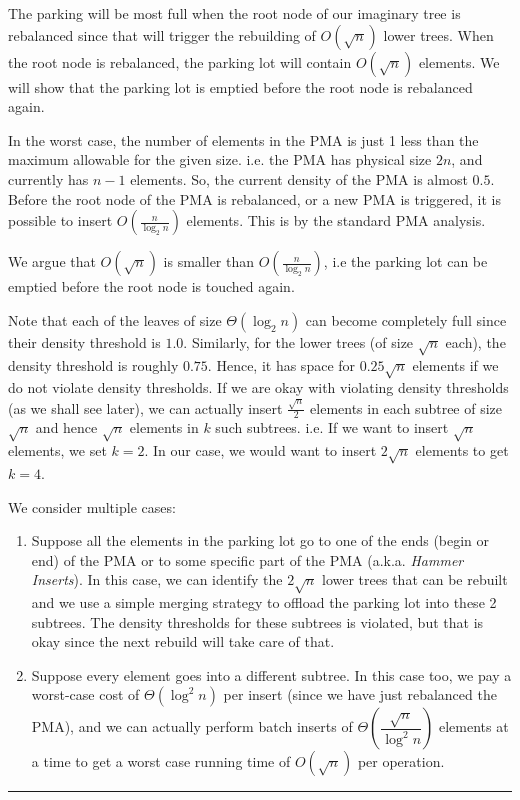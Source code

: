 \documentclass[10pt]{article}
\newenvironment{proof}{{\bf Proof:  }}{\hfill\rule{2mm}{2mm}}
\begin{document}
\begin{proof}

The parking will be most full when the root node of our imaginary tree
is rebalanced since that will trigger the rebuilding of $O(\sqrt{n})$
lower trees. When the root node is rebalanced, the parking lot will
contain $O(\sqrt{n})$ elements. We will show that the parking lot is
emptied before the root node is rebalanced again.

In the worst case, the number of elements in the PMA is just 1 less
than the maximum allowable for the given size. i.e. the PMA has
physical size $2n$, and currently has $n-1$ elements. So, the current density of the PMA is almost
$0.5$. Before the root node of the PMA is rebalanced, or a new PMA is triggered, it is possible to insert $O(\frac{n}{\log_2{n}})$ elements. This is by the standard PMA analysis.

We argue that $O(\sqrt{n})$ is smaller than  $O(\frac{n}{\log_2{n}})$, i.e the parking lot can be emptied before the root node is touched again.

Note that each of the leaves of size $\Theta(\log_2{n})$ can become completely full
since their density threshold is $1.0$.  Similarly, for the lower trees (of size $\sqrt{n}$ each), the
density threshold is roughly $0.75$. Hence, it has space for $0.25\sqrt{n}$
elements if we do not violate density thresholds. If we are okay with
violating density thresholds (as we shall see later), we can actually
insert $\frac{\sqrt{n}}{2}$ elements in each subtree of size
$\sqrt{n}$ and hence $\sqrt{n}$ elements in $k$ such subtrees. i.e. If
we want to insert $\sqrt{n}$ elements, we set $k = 2$. In our case, we
would want to insert $2\sqrt{n}$ elements to get $k = 4$. 

We consider multiple cases:

\begin{enumerate}

\item Suppose all the elements in the parking lot go to one of the
  ends (begin or end) of the PMA or to some specific part of the PMA
  (a.k.a. \textit{Hammer Inserts}). In this case, we can identify the
  $2\sqrt{n}$ lower trees that can be rebuilt and we use a simple
  merging strategy to offload the parking lot into these 2
  subtrees. The density thresholds for these subtrees is violated, but
  that is okay since the next rebuild will take care of that.

\item Suppose every element goes into a different subtree. In this
  case too, we pay a worst-case cost of $\Theta(\log^2{n})$ per insert
  (since we have just rebalanced the PMA), and we can actually perform
  batch inserts of $\Theta\left(\dfrac{\sqrt{n}}{\log^2{n}}\right)$ elements at a time to get a
  worst case running time of $O(\sqrt{n})$ per operation.


\end{enumerate}
\end{proof}
\end{document}
